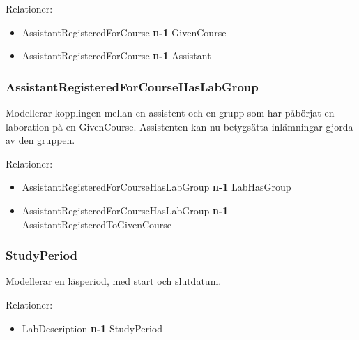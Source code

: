 Relationer: 
\begin{itemize}
  \item AssistantRegisteredForCourse {\bf n-1} GivenCourse 
  \item AssistantRegisteredForCourse {\bf n-1} Assistant 
\end{itemize}

\subsubsection{AssistantRegisteredForCourseHasLabGroup}
Modellerar kopplingen mellan en assistent och en grupp som har påbörjat en laboration på en GivenCourse. Assistenten kan nu betygsätta inlämningar gjorda av den gruppen. 

Relationer: 
\begin{itemize}
  \item AssistantRegisteredForCourseHasLabGroup {\bf n-1} LabHasGroup 
  \item AssistantRegisteredForCourseHasLabGroup {\bf n-1} AssistantRegisteredToGivenCourse 
\end{itemize}

\subsubsection{StudyPeriod}
Modellerar en läsperiod, med start och slutdatum.

Relationer: 
\begin{itemize}
  \item LabDescription {\bf n-1} StudyPeriod 
\end{itemize}
